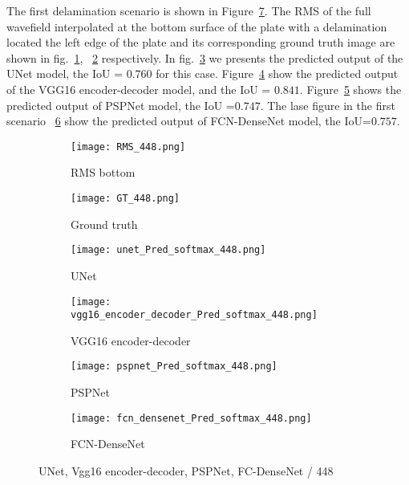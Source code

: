 The first delamination scenario is shown in Figure~\ref{fig:softmax_448}. 
The RMS of the full wavefield interpolated at the bottom surface of the plate with a delamination located the left edge of the plate and its corresponding ground truth image are shown in fig.~\ref{fig:RMS_flat_shell_Vz_448}, ~\ref{fig:m1_rand_single_delam_448} respectively. 
In fig.~\ref{fig:unet_pred_448} we presents the predicted output of the UNet model, the IoU = \(0.760\) for this case.
Figure~\ref{fig:vgg16_pred_448} show the predicted output of the VGG16 encoder-decoder model, and the IoU = \(0.841\). 
Figure~\ref{fig:pspnet_pred_448} shows the predicted output of PSPNet model, the IoU =\(0.747\).
The lase figure in the first scenario ~\ref{fig:fcn_densenet_pred_448}	show the predicted output of FCN-DenseNet model, the IoU=\(0.757\).
\begin{figure} [!h]
	\centering
	\begin{subfigure}[b]{0.47\textwidth}
		\centering
		\texttt{[image: RMS\_448.png]}
		\caption{RMS bottom}
		\label{fig:RMS_flat_shell_Vz_448}
	\end{subfigure}
	\hfill
	\begin{subfigure}[b]{0.47\textwidth}
		\centering
		\texttt{[image: GT\_448.png]}
		\caption{Ground truth}
		\label{fig:m1_rand_single_delam_448}
	\end{subfigure}
	\begin{subfigure}[b]{0.47\textwidth}
		\centering
		\texttt{[image: unet\_Pred\_softmax\_448.png]}
		\caption{UNet}
		\label{fig:unet_pred_448}
	\end{subfigure}
	\hfill
	\begin{subfigure}[b]{0.47\textwidth}
		\centering
		\texttt{[image: vgg16\_encoder\_decoder\_Pred\_softmax\_448.png]}
		\caption{VGG16 encoder-decoder}
		\label{fig:vgg16_pred_448}
	\end{subfigure}
	\hfill
	\begin{subfigure}[b]{0.47\textwidth}
		\centering
		\texttt{[image: pspnet\_Pred\_softmax\_448.png]}
		\caption{PSPNet}
		\label{fig:pspnet_pred_448}
	\end{subfigure}
	\hfill
	\begin{subfigure}[b]{0.47\textwidth}
		\centering
		\texttt{[image: fcn\_densenet\_Pred\_softmax\_448.png]}
		\caption{FCN-DenseNet}
		\label{fig:fcn_densenet_pred_448}
	\end{subfigure}
	\caption{UNet, Vgg16 encoder-decoder, PSPNet, FC-DenseNet /  448}
	\label{fig:softmax_448}
\end{figure} 


